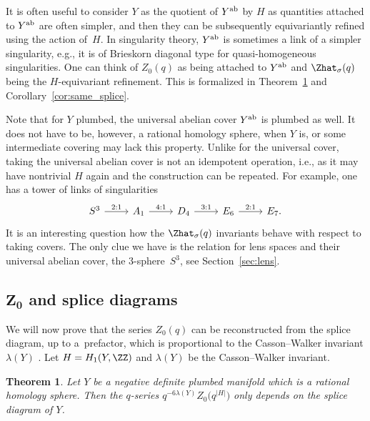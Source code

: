 \documentclass[10pt,a4paper]{amsart}
\newtheorem{Theorem}{Theorem}[section]
\begin{document}
It is often useful to consider $Y$ as the quotient of $Y^{\rm ab}$ by $H$ as quantities attached to $Y^{\rm ab}$ are often simpler, and then they can be subsequently equivariantly refined using the action of~$H$. In singularity theory, $Y^{\rm ab}$ is sometimes a link of a simpler singularity, e.g., it is of Brieskorn diagonal type for quasi-homogeneous singularities. One can think of $Z_0(q)$ as being attached to $Y^{\rm ab}$ and $\Zhat_\sigma(q)$ being the $H$-equivariant refinement. This is formalized in Theorem~\ref{thm:plumbing} and Corollary~\ref{cor:same_splice}.

Note that for $Y$ plumbed, the universal abelian cover $Y^{\rm ab}$ is plumbed as well. It does not have to be, however, a rational homology sphere, when $Y$ is, or some intermediate covering may lack this property. Unlike for the universal cover, taking the universal abelian cover is not an idempotent operation, i.e., as it may have nontrivial $H$ again and the construction can be repeated. For example, one has a tower of links of singularities
	\[
		\begin{tikzcd}
			S^3 \arrow[r, "{2:1}"] & A_1 \arrow[r, "{4:1}"] & D_4 \arrow[r, "{3:1}"] & E_6 \arrow[r, "{2:1}"] & E_7.
		\end{tikzcd}
	\]
It is an interesting question how the $\Zhat_\sigma(q)$ invariants behave with respect to taking covers. The only clue we have is the relation for lens spaces and their universal abelian cover, the 3-sphere~$S^3$, see Section~\ref{sec:lens}.

\subsection[Z_0 and splice diagrams]{$\boldsymbol{Z_0}$ and splice diagrams}

We will now prove that the series $Z_0(q)$ can be reconstructed from the splice diagram, up to a~prefactor, which is proportional to the Casson--Walker invariant $\lambda(Y)$ \cite{Wa92}. Let $H = H_1(Y, \ZZ)$ and $\lambda(Y)$ be the Casson--Walker invariant.
%

\begin{Theorem}\label{thm:plumbing}
	Let $Y$ be a negative definite plumbed manifold which is a rational homology sphere. Then the $q$-series
$
		q^{-6 \lambda(Y)} Z_{0}\bigl(q^{|H|}\bigr)
$
	only depends on the splice diagram of $Y$.
\end{Theorem}
\end{document}
